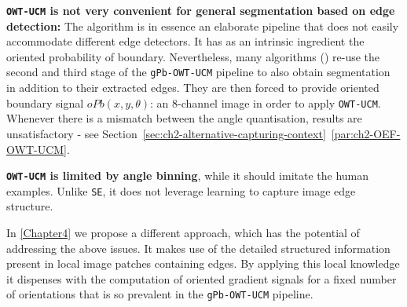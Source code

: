 \textbf{\texttt{OWT-UCM} is not very convenient for general segmentation based on edge detection:} The algorithm is in essence an elaborate pipeline that does not easily accommodate different edge detectors. It has as an intrinsic ingredient the oriented probability of boundary. Nevertheless, many algorithms (\eg \cite{Kisilev2013Learning,Arbelaez2014multiscale,Isola2014crisp,Hallman2014}) re-use the second and third stage of the {\tt gPb-OWT-UCM} pipeline to also obtain segmentation in addition to their extracted edges. They are then forced to provide oriented boundary signal $oPb(x,y,\theta)$: an 8-channel image in order to apply {\tt OWT-UCM}. Whenever there is a mismatch between the angle quantisation, results are %
unsatisfactory %
- see Section~\ref*{sec:ch2-alternative-capturing-context}~\ref{par:ch2-OEF-OWT-UCM}.

\textbf{\texttt{OWT-UCM} is limited by angle binning}, while it should imitate the human examples. Unlike {\tt SE}, it does not leverage learning to capture image edge structure.

In \cref{Chapter4} we propose a different %
approach, which has the potential of addressing the above issues. It makes use of the detailed structured information present in local image patches containing edges. By applying this local knowledge it dispenses with the computation of oriented gradient signals for a fixed number of orientations that is so prevalent in the {\tt gPb-OWT-UCM} pipeline.
